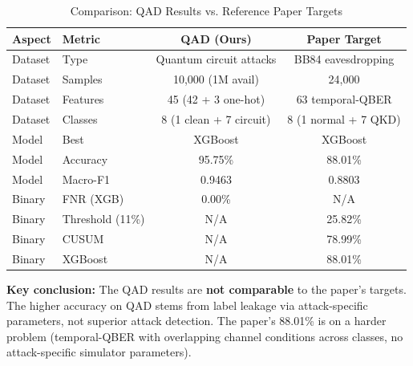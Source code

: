 \begin{table}[H]
\centering
\caption{Comparison: QAD Results vs. Reference Paper Targets}
\label{tab:comparison}
\begin{tabular}{llcc}
\toprule
\textbf{Aspect} & \textbf{Metric} & \textbf{QAD (Ours)} & \textbf{Paper Target} \\
\midrule
Dataset & Type & Quantum circuit attacks & BB84 eavesdropping \\
Dataset & Samples & 10,000 (1M avail) & 24,000 \\
Dataset & Features & 45 (42 + 3 one-hot) & 63 temporal-QBER \\
Dataset & Classes & 8 (1 clean + 7 circuit) & 8 (1 normal + 7 QKD) \\
Model & Best & XGBoost & XGBoost \\
Model & Accuracy & 95.75\% & 88.01\% \\
Model & Macro-F1 & 0.9463 & 0.8803 \\
Binary & FNR (XGB) & 0.00\% & N/A \\
Binary & Threshold (11\%) & N/A & 25.82\% \\
Binary & CUSUM & N/A & 78.99\% \\
Binary & XGBoost & N/A & 88.01\% \\
\bottomrule
\end{tabular}
\end{table}

\textbf{Key conclusion:} The QAD results are \textbf{not comparable} to the paper's targets. The higher accuracy on QAD stems from label leakage via attack-specific parameters, not superior attack detection. The paper's 88.01\% is on a harder problem (temporal-QBER with overlapping channel conditions across classes, no attack-specific simulator parameters).